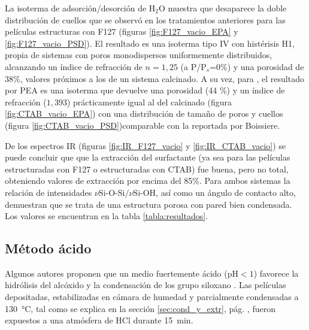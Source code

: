 		 La isoterma de adsorción/desorción de H$_2$O muestra que desaparece la doble distribución de cuellos que se observó en los tratamientos anteriores para las películas estructuras con F127 (figuras \ref{fig:F127_vacio_EPA} y \ref{fig:F127_vacio_PSD}). El resultado es una isoterma tipo IV con histérisis H1, propia de sistemas con poros monodispersos uniformemente distribuidos, alcanzando un índice de refracción de $n=1,25$ (a P/P$_s$=0\%) y una porosidad de $38\%$, valores próximos a los de un sistema calcinado. A su vez, para \pdmC, el resultado por PEA es una isoterma que devuelve una porosidad (44 \%) y un índice de refracción ($1,393$) prácticamente igual al del calcinado (figura \ref{fig:CTAB_vacio_EPA}) con una distribución de tamaño de poros y cuellos (figura \ref{fig:CTAB_vacio_PSD})comparable con la reportada por Boissiere\cite{Boissiere2005}.

		 De los espectros IR  (figuras \ref{fig:IR_F127_vacio} y \ref{fig:IR_CTAB_vacio}) se puede concluir que que la extracción del surfactante (ya sea para las películas estructuradas con F127 o estructuradas con CTAB) fue buena, pero no total, obteniendo valores de extracción por encima del 85\%. Para ambos sistemas la relación de intensidades $\nu{\text{Si-O-Si/}}\nu{\text{Si-OH}}$, así como un ángulo de contacto alto, demuestran que se trata de una estructura porosa con pared bien condensada. Los valores se encuentran en la tabla \ref{tabla:resultados}.


	 \subsection{Método ácido}

	 	 Algunos autores proponen que un medio fuertemente ácido (pH$<1$) favorece la hidrólisis del alcóxido y la condensación de los grupo siloxano \cite{Soler-Illia2011,Doshi2000a,Boissiere2000,Huo1996,Beck1992}. Las películas depositadas, estabilizadas en cámara de humedad y  parcialmente condensadas a \SI{130}{\celsius}, tal como se explica en la sección \ref{sec:cond_y_extr}, pág. \pageref{sec:cond_y_extr}, fueron expuestos a una atmósfera de HCl durante \SI{15}{\minute}. 

